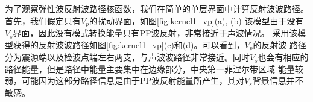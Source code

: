 为了观察弹性波反射波路径核函数，我们在简单的单层界面中计算反射波波路径。首先，我们假定只有$V_p$的扰动界面，如图\ref{fig:kernel1_vp}(a), (b)
该模型由于没有$V_s$界面，因此没有模式转换能量只有PP波反射，非常接近于声波情况。
采用该模型获得的反射波波路径如图\ref{fig:kernel1_vp}(c)和(d)。可以看到，$V_p$的反射波
路径分为震源端以及检波点端左右两支，与声波波路径非常接近。同时$V_s$也会有相应的路径能量，但是路径中能量主要集中在边缘部分，中央第一菲涅尔带区域
能量较弱，可能因为这部分路径信息是由于PP波反射能量所产生，其对$V_s$背景信息并不敏感。

